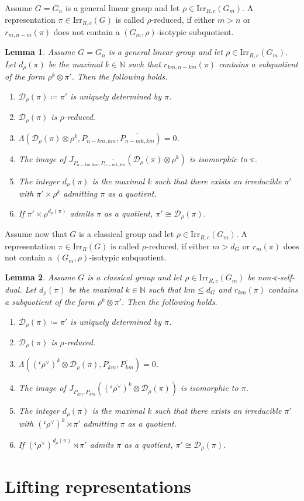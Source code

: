 \documentclass[10pt,a4paper]{article}
\newtheorem{lemma}{Lemma}
\theoremstyle{remark}
\theoremstyle{definition}
\newcommand{\NN}{\mathbb{N}}
\newcommand{\irr}{\mathrm{Irr}}
\newcommand{\dr}{\mathcal{D}_\rho}
\newcommand{\fc}{\mathfrak{c}}
\begin{document}
  Assume $G=G_n$ is a general linear group and let $\rho\in\irr_{R,c}(G_m)$. A representation $\pi\in\irr_{R,c}(G)$ is called $\rho$-reduced, if either $m>n$ or $r_{m,n-m}(\pi)$ does not contain a $(G_m,\rho)$-isotypic subquotient.
    \begin{lemma}\label{L:dergl}
        Assume $G=G_n$ is a general linear group and let $\rho\in\irr_{R,c}(G_m)$. Let $d_\rho(\pi)$ be the maximal $k\in\NN$ such that $r_{km,n-km}(\pi)$ contains a subquotient of the form $\rho^k\otimes \pi'$. Then the following holds.
        \begin{enumerate}
            \item $\dr(\pi)\coloneqq \pi'$ is uniquely determined by $\pi$.
            \item $\dr(\pi)$ is $\rho$-reduced.
            \item $\Lambda(\dr(\pi)\otimes\rho^k,P_{n-km,km},\overline{P_{n-mk,km}})=0$.
            \item The image of $J_{P_{n-km,km},\overline{P_{n-mk,km}}}(\dr(\pi)\otimes \rho^k)$ is isomorphic to $\pi$.
            \item The integer $d_\rho(\pi)$ is the maximal $k$ such that there exists an irreducible $\pi'$ with $\pi'\times\rho^k$ admitting $\pi$ as a quotient.
            \item If $\pi'\times\rho^{d_\rho(\pi)}$ admits $\pi$ as a quotient, $\pi'\cong \dr(\pi)$.
        \end{enumerate}
    \end{lemma}
Assume now that $G$ is a classical group and let $\rho\in\irr_{R,c}(G_m)$. A representation $\pi\in\irr_R(G)$ is called $\rho$-reduced, if either $m>d_G$ or $r_{m}(\pi)$ does not contain a $(G_m,\rho)$-isotypic subquotient.
\begin{lemma}\label{L:dercl}
   Assume $G$ is a classical group and let $\rho\in\irr_{R,c}(G_m)$ be non-$\fc$-self-dual. Let $d_\rho(\pi)$ be the maximal $k\in\NN$ such that $km\le d_G$ and $r_{km}(\pi)$ contains a subquotient of the form $\rho^k\otimes \pi'$. Then the following holds.
        \begin{enumerate}
            \item $\dr(\pi)\coloneqq \pi'$ is uniquely determined by $\pi$.
            \item $\dr(\pi)$ is $\rho$-reduced.
            \item $\Lambda(({}^\fc\rho^\lor)^k\otimes \dr(\pi),P_{km},\overline{P_{km}})=0$.
            \item The image of $J_{P_{km},\overline{P_{km}}}(({}^\fc\rho^\lor)^k\otimes \dr(\pi))$ is isomorphic to $\pi$.
            \item The integer $d_\rho(\pi)$ is the maximal $k$ such that there exists an irreducible $\pi'$ with $({}^\fc\rho^\lor)^k\rtimes \pi'$ admitting $\pi$ as a quotient.
            \item If $({}^\fc\rho^\lor)^{d_\rho(\pi)}\rtimes \pi'$ admits $\pi$ as a quotient, $\pi'\cong \dr(\pi)$.
        \end{enumerate}
    \end{lemma}\section{Lifting representations}
\end{document}
